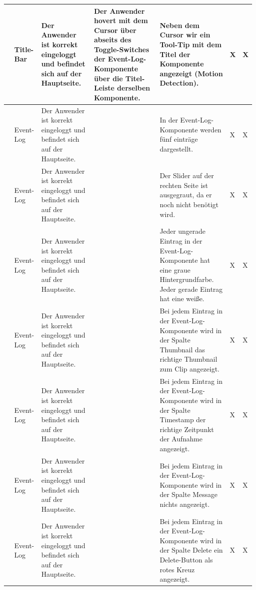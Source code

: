 \begin{longtable}{| p{} | p{} | p{} | p{} | p{} | p{} | p{} |}
	\stepcounter{TestNumber}\arabic{TestNumber} & Title-Bar & Der Anwender ist korrekt eingeloggt und befindet sich auf der Hauptseite. & Der Anwender hovert mit dem Cursor über abseits des Toggle-Switches der Event-Log-Komponente über die Titel-Leiste derselben Komponente. & Neben dem Cursor wir ein Tool-Tip mit dem Titel der Komponente angezeigt (Motion Detection). & X & X \\ \hline
	
	\stepcounter{TestNumber}\arabic{TestNumber} & Event-Log & Der Anwender ist korrekt eingeloggt und befindet sich auf der Hauptseite. & & In der Event-Log-Komponente werden fünf einträge dargestellt. & X & X \\ \hline
	
	\stepcounter{TestNumber}\arabic{TestNumber} & Event-Log & Der Anwender ist korrekt eingeloggt und befindet sich auf der Hauptseite. & & Der Slider auf der rechten Seite ist ausgegraut, da er noch nicht benötigt wird. & X & X \\ \hline
	
	\stepcounter{TestNumber}\arabic{TestNumber} & Event-Log & Der Anwender ist korrekt eingeloggt und befindet sich auf der Hauptseite. & & Jeder ungerade Eintrag in der Event-Log-Komponente hat eine graue Hintergrundfarbe. Jeder gerade Eintrag hat eine weiße.  & X & X \\ \hline
	
	\stepcounter{TestNumber}\arabic{TestNumber} & Event-Log & Der Anwender ist korrekt eingeloggt und befindet sich auf der Hauptseite. & & Bei jedem Eintrag in der Event-Log-Komponente wird in der Spalte Thumbnail das richtige Thumbnail zum Clip angezeigt. & X & X \\ \hline
	
	\stepcounter{TestNumber}\arabic{TestNumber} & Event-Log & Der Anwender ist korrekt eingeloggt und befindet sich auf der Hauptseite. & & Bei jedem Eintrag in der Event-Log-Komponente wird in der Spalte Timestamp der richtige Zeitpunkt der Aufnahme angezeigt. & X & X \\ \hline
	
	\stepcounter{TestNumber}\arabic{TestNumber} & Event-Log & Der Anwender ist korrekt eingeloggt und befindet sich auf der Hauptseite. & & Bei jedem Eintrag in der Event-Log-Komponente wird in der Spalte Message nichts angezeigt. & X & X \\ \hline
	
	\stepcounter{TestNumber}\arabic{TestNumber} & Event-Log & Der Anwender ist korrekt eingeloggt und befindet sich auf der Hauptseite. & & Bei jedem Eintrag in der Event-Log-Komponente wird in der Spalte Delete ein Delete-Button als rotes Kreuz angezeigt. & X & X \\ \hline
	

\end{longtable}

